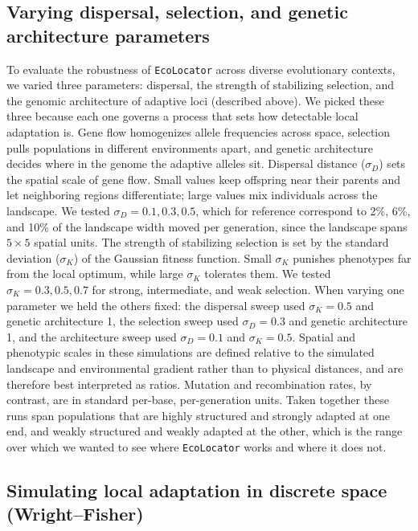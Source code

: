 \documentclass[]{article}
\newcommand{\ecolocator}{\texttt{EcoLocator}\xspace}
\begin{document}
\subsection{Varying dispersal, selection, and genetic architecture parameters}
To evaluate the robustness of \ecolocator
across diverse evolutionary contexts,
we varied three parameters: dispersal,
the strength of stabilizing selection,
and the genomic architecture of adaptive loci (described above).
We picked these three because each one governs
a process that sets how detectable local adaptation is.
Gene flow homogenizes allele frequencies across space,
selection pulls populations in different environments apart,
and genetic architecture decides where in the genome
the adaptive alleles sit.
Dispersal distance (\(\sigma_D\)) sets the spatial scale
of gene flow. Small values keep offspring near their parents
and let neighboring regions differentiate;
large values mix individuals across the landscape.
We tested \(\sigma_D = 0.1, 0.3, 0.5\), which for reference correspond to 2\%, 6\%, and 10\% of the landscape width moved per generation, since the landscape spans $5 \times 5$ spatial units.
The strength of stabilizing selection is set
by the standard deviation (\(\sigma_K\))
of the Gaussian fitness function.
Small \(\sigma_K\) punishes phenotypes far from the local optimum,
while large \(\sigma_K\) tolerates them.
We tested \(\sigma_K = 0.3, 0.5, 0.7\)
for strong, intermediate, and weak selection.
When varying one parameter we held the others fixed:
the dispersal sweep used \(\sigma_K = 0.5\) and genetic architecture 1,
the selection sweep used \(\sigma_D = 0.3\) and genetic architecture 1,
and the architecture sweep used \(\sigma_D = 0.1\) and \(\sigma_K = 0.5\).
Spatial and phenotypic scales in these simulations are defined relative to the 
simulated landscape and environmental gradient rather than to physical distances,
and are therefore best interpreted as ratios.
Mutation and recombination rates, by contrast, are in standard per-base, per-generation units.
Taken together these runs span populations that are highly structured
and strongly adapted at one end,
and weakly structured and weakly adapted at the other,
which is the range over which we wanted to see
where \ecolocator works and where it does not.

\subsection{Simulating local adaptation in discrete space (Wright--Fisher)}
\end{document}
